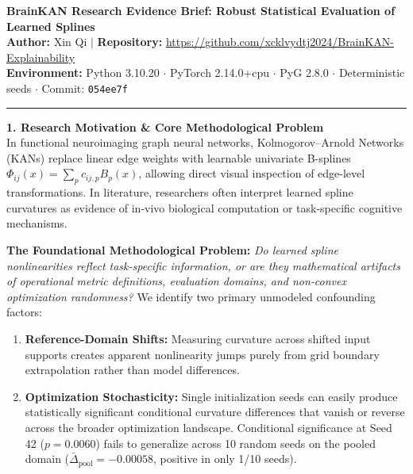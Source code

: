 \documentclass[9pt]{article}
\begin{document}

\begin{center}
    {\large \textbf{BrainKAN Research Evidence Brief: Robust Statistical Evaluation of Learned Splines}}\\[1pt]
    \textbf{Author:} Xin Qi \quad $\vert$ \quad \textbf{Repository:} \url{https://github.com/xcklvydtj2024/BrainKAN-Explainability}\\[1pt]
    {\footnotesize \textbf{Environment:} Python 3.10.20 $\cdot$ PyTorch 2.14.0+cpu $\cdot$ PyG 2.8.0 $\cdot$ Deterministic seeds $\cdot$ Commit: \texttt{054ee7f}}
\end{center}
\vspace{-6pt}
\hrule
\vspace{3pt}

\textbf{\large 1. Research Motivation \& Core Methodological Problem}\\[1pt]
In functional neuroimaging graph neural networks, Kolmogorov--Arnold Networks (KANs) replace linear edge weights with learnable univariate B-splines $\Phi_{ij}(x) = \sum_{p} c_{ij,p} B_p(x)$, allowing direct visual inspection of edge-level transformations. In literature, researchers often interpret learned spline curvatures as evidence of in-vivo biological computation or task-specific cognitive mechanisms.

\textbf{The Foundational Methodological Problem:}
\textit{Do learned spline nonlinearities reflect task-specific information, or are they mathematical artifacts of operational metric definitions, evaluation domains, and non-convex optimization randomness?}
We identify two primary unmodeled confounding factors:
\begin{enumerate}\itemsep -2.5pt
    \item \textbf{Reference-Domain Shifts:} Measuring curvature across shifted input supports creates apparent nonlinearity jumps purely from grid boundary extrapolation rather than model differences.
    \item \textbf{Optimization Stochasticity:} Single initialization seeds can easily produce statistically significant conditional curvature differences that vanish or reverse across the broader optimization landscape. Conditional significance at Seed 42 ($p = 0.0060$) fails to generalize across 10 random seeds on the pooled domain ($\bar{\Delta}_{\mathrm{pool}} = -0.00058$, positive in only 1/10 seeds).
\end{enumerate}
\end{document}
